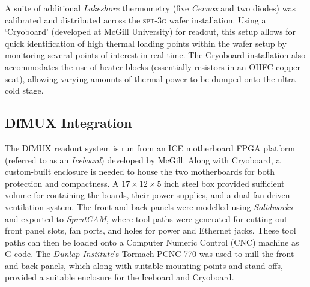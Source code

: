 \documentclass[iop]{emulateapj}
\begin{document}
A suite of additional \textit{Lakeshore} thermometry (five \textit{Cernox} and two diodes) was calibrated and distributed across the \textsc{spt-3g} wafer installation.  Using a `Cryoboard' (developed at McGill University) for readout, this setup allows for quick identification of high thermal loading points within the wafer setup by monitoring several points of interest in real time.  The Cryoboard installation also accommodates the use of heater blocks (essentially resistors in an OHFC copper seat), allowing varying amounts of thermal power to be dumped onto the ultra-cold stage.


\subsection{DfMUX Integration}

The DfMUX readout system is run from an ICE motherboard FPGA platform (referred to as an \textit{Iceboard}) developed by McGill.  Along with Cryoboard, a custom-built enclosure is needed to house the two motherboards for both protection and compactness.  A $17\times12\times5$ inch steel box provided sufficient volume for containing the boards, their power supplies, and a dual fan-driven ventilation system.  The front and back panels were modelled using \textit{Solidworks} and exported to \textit{SprutCAM}, where tool paths were generated for cutting out front panel slots, fan ports, and holes for power and Ethernet jacks.  These tool paths can then be loaded onto a Computer Numeric Control (CNC) machine as G-code.  The \textit{Dunlap Institute}'s Tormach PCNC 770 was used to mill the front and back panels, which along with suitable mounting points and stand-offs, provided a suitable enclosure for the Iceboard and Cryoboard.
\end{document}
